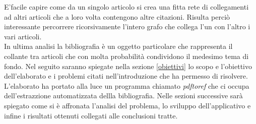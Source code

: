 E'facile capire come da un singolo articolo si crea una fitta rete di collegamenti ad altri articoli che a loro volta contengono altre citazioni. Risulta perciò interessante percorrere ricorsivamente l'intero grafo che collega l'un con l'altro i vari articoli.\\

In ultima analisi la bibliografia è un oggetto particolare che rappresenta il collante tra articoli che con molta probabilità condividono il medesimo tema di fondo. Nel seguito saranno spiegate nella sezione \ref{obiettivi} lo scopo e l'obiettivo dell'elaborato e i problemi citati nell'introduzione che ha permesso di risolvere. L'elaborato ha portato alla luce  un programma chiamato \textit{pdftoref} che ci occupa dell'estrazzione automatizzata dellla bibliografia. Nelle sezioni successive sarà spiegato come si è affronata l'analisi del problema, lo sviluppo dell'applicativo e infine i risultati ottenuti collegati alle conclusioni tratte.



